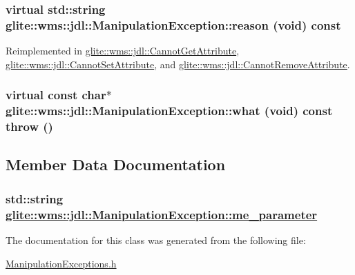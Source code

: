 \hypertarget{classglite_1_1wms_1_1jdl_1_1ManipulationException_a4}{
\subsubsection[reason]{\setlength{\rightskip}{0pt plus 5cm}virtual std::string glite::wms::jdl::Manipulation\-Exception::reason (void) const}}
\label{classglite_1_1wms_1_1jdl_1_1ManipulationException_a4}




Reimplemented in \hyperlink{classglite_1_1wms_1_1jdl_1_1CannotGetAttribute_a2}{glite::wms::jdl::Cannot\-Get\-Attribute}, \hyperlink{classglite_1_1wms_1_1jdl_1_1CannotSetAttribute_a2}{glite::wms::jdl::Cannot\-Set\-Attribute}, and \hyperlink{classglite_1_1wms_1_1jdl_1_1CannotRemoveAttribute_a2}{glite::wms::jdl::Cannot\-Remove\-Attribute}.\hypertarget{classglite_1_1wms_1_1jdl_1_1ManipulationException_a3}{
\subsubsection[what]{\setlength{\rightskip}{0pt plus 5cm}virtual const char$\ast$ glite::wms::jdl::Manipulation\-Exception::what (void) const  throw ()}}
\label{classglite_1_1wms_1_1jdl_1_1ManipulationException_a3}




\subsection{Member Data Documentation}
\hypertarget{classglite_1_1wms_1_1jdl_1_1ManipulationException_p0}{
\subsubsection[me\_\-parameter]{\setlength{\rightskip}{0pt plus 5cm}std::string \hyperlink{classglite_1_1wms_1_1jdl_1_1ManipulationException_p0}{glite::wms::jdl::Manipulation\-Exception::me\_\-parameter}}}
\label{classglite_1_1wms_1_1jdl_1_1ManipulationException_p0}




The documentation for this class was generated from the following file:\begin{CompactItemize}
\item 
\hyperlink{ManipulationExceptions_8h}{Manipulation\-Exceptions.h}\end{CompactItemize}
